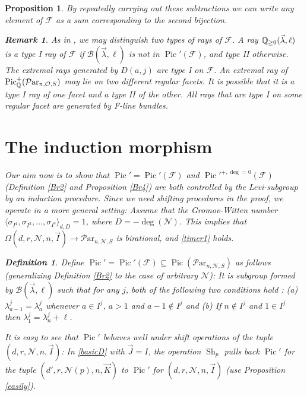 \documentclass[11pt]{amsart}
\newcommand\op{\operatorname}
\newcommand\mf{\mathcal{F}}
\newcommand\Pic{\operatorname{Pic}}
\newcommand\mn{\mathcal{N}}
\newcommand\Par{\mathcal{P}\text{ar} }
\newtheorem{remark}[theorem]{ Remark}
\newtheorem{proposition}[theorem]{Proposition}
\newtheorem{defi}[theorem]{Definition}
\numberwithin{theorem}{subsection}
\begin{document}
{\begin{proposition}
By repeatedly carrying out these subtractions we can write any element of  $\mf$ as a sum corresponding to the second bijection.
\begin{remark}
As in \cite{BHermit,BKiers,Kiers}, we may distinguish two types of rays of $\mathcal{F}$. A ray
$\Bbb{Q}_{\geq 0}(\vec{\lambda},\ell)$ is a type I ray of $\mathcal{F}$ if $\mathcal{B}(\vec{\lambda},\ell)$ is not in $\Pic'(\mf)$, and type II otherwise. The extremal rays  generated by $D(a,j)$  are  type I on $\mf$. An extremal ray of  $\Pic^+_{\Bbb{Q}}(\Par_{n,\mathcal{O},S})$ may lie on two different regular facets. It is possible that it is a type I ray of one facet and a type II of the other. All rays that are type I on some regular facet are generated by F-line bundles.
\end{remark}

\section{The induction morphism}\label{noncan}
Our aim now is to show that  $\Pic'=\Pic'(\mf)$ and $\Pic'^{+,\deg=0}(\mf)$ (Definition  \ref{Br2} and Proposition \ref{Br4}) are both controlled by the Levi-subgroup by an induction procedure. Since we need shifting procedures in the proof, we operate in a more general setting:
Assume that the Gromov-Witten number $\langle\sigma_{I^1}, \sigma_{I^2},\dots,\sigma_{I^s}\rangle_{d,D}=1$, where $D=-\deg(\mn)$. This implies that $\Omega(d,r,\mn,n,\vec{I})\to \Par_{n,\mn,S}$ is birational, and \eqref{timer1} holds.

\begin{defi}
Define $\Pic'=\Pic'(\mf)\subseteq\Pic(\Par_{n,\mn,S})$ as follows (generalizing  Definition  \ref{Br2} to the case of arbitrary $\mathcal{N}$): It is subgroup formed by  $\mathcal{B}(\vec{\lambda},\ell)$ such that for any $j$, both of the following two conditions hold : (a) $\lambda^j_{a-1}=\lambda^{j}_{a}$ whenever $a\in I^j$, $a>1$ and $a-1\not \in I^j$ and (b) If $n\not\in I^j$ and $1\in I^j$ then $\lambda^j_1=\lambda^{j}_{n}+\ell$.
\end{defi}
It is easy to see that $\Pic'$ behaves well under shift operations of the tuple $(d,r,\mn,n,\vec{I})$: In \eqref{basicD} with $\vec{J}=I$, the operation $\op{Sh}_p$ pulls back $\Pic'$ for the tuple $(d',r,\mn(p),n,\vec{K})$ to $\Pic'$ for $(d,r,\mn,n,\vec{I})$ (use Proposition  \ref{easily}).



\end{proposition}}
\end{document}
